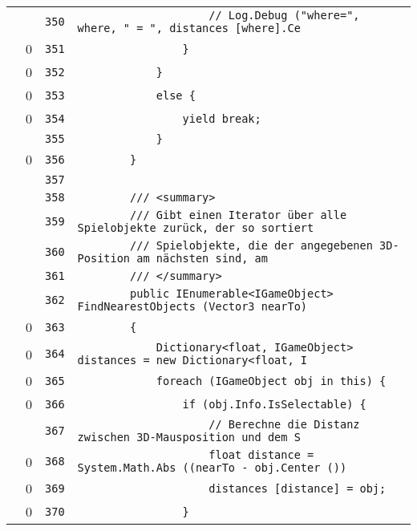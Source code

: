 \documentclass[a4paper,10pt]{article}
\begin{document}
\begin{longtable}[l]{lrrl}
\cellcolor{gray} &  & \verb~350~ & \verb~                    // Log.Debug ("where=", where, " = ", distances [where].Ce~\\
\cellcolor{red} & 0 & \verb~351~ & \verb~                }~\\
\cellcolor{red} & 0 & \verb~352~ & \verb~            }~\\
\cellcolor{red} & 0 & \verb~353~ & \verb~            else {~\\
\cellcolor{red} & 0 & \verb~354~ & \verb~                yield break;~\\
\cellcolor{gray} &  & \verb~355~ & \verb~            }~\\
\cellcolor{red} & 0 & \verb~356~ & \verb~        }~\\
\cellcolor{gray} &  & \verb~357~ & \verb~~\\
\cellcolor{gray} &  & \verb~358~ & \verb~        /// <summary>~\\
\cellcolor{gray} &  & \verb~359~ & \verb~        /// Gibt einen Iterator über alle Spielobjekte zurück, der so sortiert~\\
\cellcolor{gray} &  & \verb~360~ & \verb~        /// Spielobjekte, die der angegebenen 3D-Position am nächsten sind, am~\\
\cellcolor{gray} &  & \verb~361~ & \verb~        /// </summary>~\\
\cellcolor{gray} &  & \verb~362~ & \verb~        public IEnumerable<IGameObject> FindNearestObjects (Vector3 nearTo)~\\
\cellcolor{red} & 0 & \verb~363~ & \verb~        {~\\
\cellcolor{red} & 0 & \verb~364~ & \verb~            Dictionary<float, IGameObject> distances = new Dictionary<float, I~\\
\cellcolor{red} & 0 & \verb~365~ & \verb~            foreach (IGameObject obj in this) {~\\
\cellcolor{red} & 0 & \verb~366~ & \verb~                if (obj.Info.IsSelectable) {~\\
\cellcolor{gray} &  & \verb~367~ & \verb~                    // Berechne die Distanz zwischen 3D-Mausposition und dem S~\\
\cellcolor{red} & 0 & \verb~368~ & \verb~                    float distance = System.Math.Abs ((nearTo - obj.Center ())~\\
\cellcolor{red} & 0 & \verb~369~ & \verb~                    distances [distance] = obj;~\\
\cellcolor{red} & 0 & \verb~370~ & \verb~                }~\\

\end{longtable}
\end{document}
